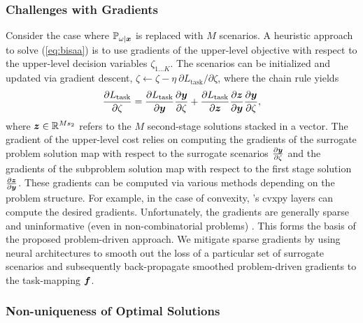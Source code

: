 \subsubsection*{Challenges with Gradients} \label{section:gradient_problems}
Consider the case where $\mathbb{P}_{\omega|\boldsymbol{x}}$ is replaced with $M$ scenarios. A heuristic approach to solve (\ref{eq:bisaa}) is to use gradients of the upper-level objective with respect to the upper-level decision variables $\zeta_{1...K}$. The scenarios can be initialized and updated via gradient descent,
$
\zeta \leftarrow \zeta - \eta \ \partial L_{\text{task}} / \partial \zeta
$, where the chain rule yields
$$\frac{\partial{L_{\text{task}}}}{\partial{\zeta}} = \frac{\partial{L_{\text{task}}}}{\partial{\boldsymbol{y}}} \frac{\partial{\boldsymbol{y}}}{\partial{\zeta}} + \frac{\partial{L_{\text{task}}}}{\partial{\boldsymbol{z}}} \frac{\partial{\boldsymbol{z}}}{{\partial{\boldsymbol{y}}}} \frac{\partial{\boldsymbol{y}}}{\partial{\zeta}},$$
where $\boldsymbol{z} \in \mathbb{R}^{M s_2}$ refers to the $M$ second-stage solutions stacked in a vector. The gradient of the upper-level cost relies on computing the gradients of the surrogate problem solution map with respect to the surrogate scenarios $\frac{\partial{\boldsymbol{y}}}{\partial{\zeta}}$ and the gradients of the subproblem solution map with respect to the first stage solution $\frac{\partial{\boldsymbol{z}}}{{\partial{\boldsymbol{y}}}}$. These gradients can be computed via various methods depending on the problem structure. For example, in the case of convexity, \citet{agrawal2019differentiable}'s \textsf{cvxpy layers} can compute the desired gradients. Unfortunately, the gradients are generally sparse and uninformative (even in non-combinatorial problems) \citep{grigas2021integrated,zharmagambetov2023landscape}. This forms the basis of the proposed problem-driven approach. We mitigate sparse gradients by using neural architectures to smooth out the loss of a particular set of surrogate scenarios and subsequently back-propagate smoothed problem-driven gradients to the task-mapping $\boldsymbol{f}$. 


\subsubsection*{Non-uniqueness of Optimal Solutions}\label{section:nonunique_optimal_solutions}

